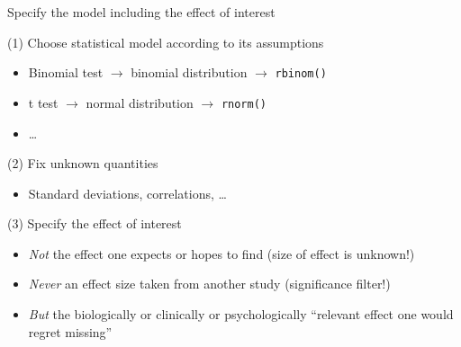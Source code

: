 \documentclass[aspectratio=169]{beamer}
\begin{document}
\begin{frame}{Specify the model including the effect of interest}

(1) Choose statistical model according to its assumptions
\begin{itemize}
\item Binomial test $\to$ binomial distribution $\to$ \texttt{rbinom()}

\item t test $\to$ normal distribution $\to$ \texttt{rnorm()}

\item \dots\\[1ex]
\end{itemize}

(2) Fix unknown quantities
\begin{itemize}
\item Standard deviations, correlations, \dots \\[1ex]
\end{itemize}

(3) Specify the effect of interest
\begin{itemize}


\item \emph{Not} the effect one expects or hopes to find (size of effect is
unknown!)

\item \emph{Never} an effect size taken from another study (significance
filter!)

\item \emph{But} the biologically or clinically or psychologically ``relevant
effect one would regret missing'' \citep{Harrell20}
\end{itemize}

\end{frame}
\end{document}
